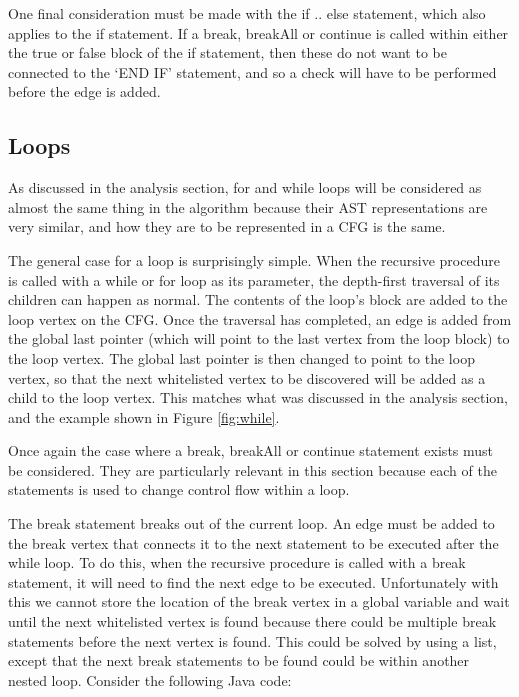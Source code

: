 One final consideration must be made with the if .. else statement, which also applies to the if statement. If a break, breakAll or continue is called within either the true or false block of the if statement, then these do not want to be connected to the `END IF' statement, and so a check will have to be performed before the edge is added. 

\subsection{Loops}

As discussed in the analysis section, for and while loops will be considered as almost the same thing in the algorithm because their AST representations are very similar, and how they are to be represented in a CFG is the same.

The general case for a loop is surprisingly simple. When the recursive procedure is called with a while or for loop as its parameter, the depth-first traversal of its children can happen as normal. The contents of the loop's block are added to the loop vertex on the CFG. Once the traversal has completed, an edge is added from the global last pointer (which will point to the last vertex from the loop block) to the loop vertex. The global last pointer is then changed to point to the loop vertex, so that the next whitelisted vertex to be discovered will be added as a child to the loop vertex. This matches what was discussed in the analysis section, and the example shown in Figure \ref{fig:while}.

Once again the case where a break, breakAll or continue statement exists must be considered. They are particularly relevant in this section because each of the statements is used to change control flow within a loop. 

The break statement breaks out of the current loop. An edge must be added to the break vertex that connects it to the next statement to be executed after the while loop. To do this, when the recursive procedure is called with a break statement, it will need to find the next edge to be executed. Unfortunately with this we cannot store the location of the break vertex in a global variable and wait until the next whitelisted vertex is found because there could be multiple break statements before the next vertex is found. This could be solved by using a list, except that the next break statements to be found could be within another nested loop. Consider the following Java code:

